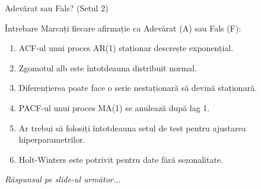 \documentclass[9pt, aspectratio=169, t]{beamer}
\begin{document}
\begin{frame}{Adevărat sau Fals? (Setul 2)}
    \begin{alertblock}{Întrebare}
        Marcați fiecare afirmație ca Adevărat (A) sau Fals (F):
    \end{alertblock}

    \vspace{0.3cm}

    \begin{enumerate}
        \item ACF-ul unui proces AR(1) staționar descrește exponențial. \hfill \underline{\hspace{1cm}}

        \vspace{0.2cm}

        \item Zgomotul alb este întotdeauna distribuit normal. \hfill \underline{\hspace{1cm}}

        \vspace{0.2cm}

        \item Diferențierea poate face o serie nestaționară să devină staționară. \hfill \underline{\hspace{1cm}}

        \vspace{0.2cm}

        \item PACF-ul unui proces MA(1) se anulează după lag 1. \hfill \underline{\hspace{1cm}}

        \vspace{0.2cm}

        \item Ar trebui să folosiți întotdeauna setul de test pentru ajustarea hiperparametrilor. \hfill \underline{\hspace{1cm}}

        \vspace{0.2cm}

        \item Holt-Winters este potrivit pentru date fără sezonalitate. \hfill \underline{\hspace{1cm}}
    \end{enumerate}

    \vspace{0.3cm}

    \begin{center}
        \textit{Răspunsul pe slide-ul următor...}
    \end{center}
\end{frame}
\end{document}
